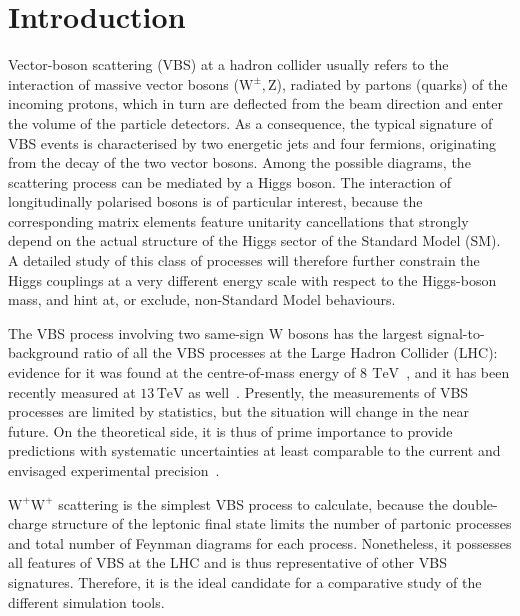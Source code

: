 \documentclass[twocolumn,epjc3]{svjour3} %
\newcommand{\PW}{\ensuremath{\text{W}}\xspace}
\newcommand{\PZ}{\ensuremath{\text{Z}}\xspace}
\newcommand{\TeV}{\ensuremath{\,\text{TeV}}\xspace}
\begin{document}
\newpage

\section{Introduction}
Vector-boson scattering (VBS) at a hadron collider 
usually refers to the interaction of massive vector bosons ($\PW^\pm,\PZ$),
radiated by partons (quarks) of the incoming protons, 
which in turn are deflected from the beam direction 
and enter the volume of the particle detectors.
As a consequence, the typical signature of VBS events
is characterised by two energetic jets 
and four fermions,
originating from the decay of the two vector bosons.
Among the possible diagrams,
the scattering process can be mediated by a Higgs boson.
The interaction of longitudinally polarised bosons is of particular interest, 
because the corresponding matrix elements feature unitarity cancellations 
that strongly depend on the actual structure of the Higgs sector of the Standard Model (SM).
A detailed study of this class of processes will therefore further constrain the Higgs couplings 
at a very different energy scale with respect to the Higgs-boson mass,
and hint at, or exclude, non-Standard Model behaviours.

The VBS process involving two same-sign $\PW$ bosons has the largest signal-to-background ratio of all the VBS processes at the Large Hadron Collider (LHC):
evidence for it was found at the centre-of-mass energy of $8~\TeV$~\cite{Aad:2014zda,Khachatryan:2014sta,Aaboud:2016ffv},
and it has been recently measured
at $13\TeV$ as well~\cite{Sirunyan:2017ret}.
Presently, the measurements of VBS processes are limited by statistics, but the situation will change in the near future.
On the theoretical side, 
it is thus of prime importance to provide predictions with systematic uncertainties
at least comparable to the current and envisaged experimental precision~\cite{CMS:2016rcn,ATL-PHYS-PUB-2017-023}.


$\PW^+\PW^+$ scattering is the simplest VBS process to calculate, 
because the double-charge structure of the leptonic final state 
limits the number of partonic processes and total number of Feynman diagrams for each process.
Nonetheless, it possesses all features of VBS at the LHC and is thus representative of other VBS signatures.
Therefore, it is the ideal candidate for a comparative study of the different simulation tools.
\end{document}
